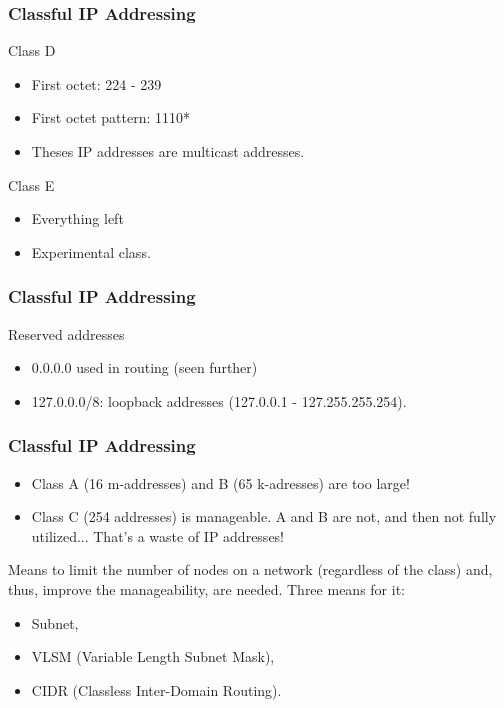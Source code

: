   \begin{frame}
    \frametitle{Classful IP Addressing}
    \begin{block}{Class D}
      \begin{itemize}
	\item First octet: {\color{ForestGreen}224} - {\color{ForestGreen}239} \pause
	\item First octet pattern: {\color{ForestGreen}1110*} \pause
	\item Theses IP addresses are multicast addresses.\pause
      \end{itemize}
    \end{block}
    \begin{block}{Class E}
      \begin{itemize}
	\item Everything left \pause
	\item Experimental class.
      \end{itemize}
    \end{block}
  \end{frame}

  \begin{frame}
    \frametitle{Classful IP Addressing}
    \begin{block}{Reserved addresses}
      \begin{itemize}
	\item 0.0.0.0 used in routing (seen further) \pause
	\item {\color{ForestGreen}127}.{\color{blue}0.0.0}{\color{brown}/8}: loopback addresses ({\color{ForestGreen}127}.{\color{blue}0.0.1} - {\color{ForestGreen}127}.{\color{blue}255.255.254}).
      \end{itemize}
    \end{block}
  \end{frame}

  \begin{frame}
    \frametitle{Classful IP Addressing}
    \begin{itemize}
      \item Class A (16 m-addresses) and B (65 k-adresses) are too large! \pause
      \item Class C (254 addresses) is manageable. A and B are not, and then not fully utilized... That's a waste of IP addresses! \pause
    \end{itemize}
    Means to limit the number of nodes on a network (regardless of the class) and, thus, improve the manageability, are needed. Three means for it:
    \begin{itemize}
      \item Subnet, \pause
      \item VLSM (Variable Length Subnet Mask), \pause
      \item CIDR (Classless Inter-Domain Routing).
    \end{itemize}
  \end{frame}




